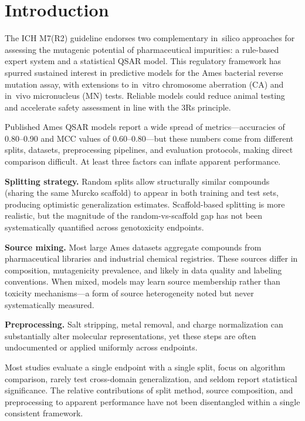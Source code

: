 \section{Introduction}

The ICH M7(R2) guideline endorses two complementary in~silico approaches for assessing the mutagenic potential of pharmaceutical impurities: a rule-based expert system and a statistical QSAR model.\cite{ICH_M7_2017} This regulatory framework has spurred sustained interest in predictive models for the Ames bacterial reverse mutation assay,\cite{Ames_1973,Mortelmans_2000} with extensions to in~vitro chromosome aberration (CA) and in~vivo micronucleus (MN) tests.\cite{OECD_473,OECD_474} Reliable models could reduce animal testing and accelerate safety assessment in line with the 3Rs principle.\cite{Russell_Burch_1959}

Published Ames QSAR models report a wide spread of metrics---accuracies of 0.80--0.90 and MCC values of 0.60--0.80\cite{Hansen_2009,Xu_2012,Honma_2019,Li_2021}---but these numbers come from different splits, datasets, preprocessing pipelines, and evaluation protocols, making direct comparison difficult. At least three factors can inflate apparent performance.

\textbf{Splitting strategy.} Random splits allow structurally similar compounds (sharing the same Murcko scaffold\cite{Bemis_Murcko_1996}) to appear in both training and test sets, producing optimistic generalization estimates. Scaffold-based splitting\cite{Sheridan_2013,Wu_MoleculeNet_2018} is more realistic, but the magnitude of the random-vs-scaffold gap has not been systematically quantified across genotoxicity endpoints.

\textbf{Source mixing.} Most large Ames datasets aggregate compounds from pharmaceutical libraries and industrial chemical registries.\cite{Hansen_2009,Honma_2019} These sources differ in composition, mutagenicity prevalence, and likely in data quality and labeling conventions. When mixed, models may learn source membership rather than toxicity mechanisms---a form of source heterogeneity noted\cite{Tropsha_2010,Hanser_2016} but never systematically measured.

\textbf{Preprocessing.} Salt stripping, metal removal, and charge normalization can substantially alter molecular representations,\cite{Fourches_2010,Fourches_2016} yet these steps are often undocumented or applied uniformly across endpoints.

Most studies evaluate a single endpoint with a single split, focus on algorithm comparison,\cite{Yang_2019,Mayr_2016} rarely test cross-domain generalization, and seldom report statistical significance.\cite{Demsar_2006} The relative contributions of split method, source composition, and preprocessing to apparent performance have not been disentangled within a single consistent framework.

